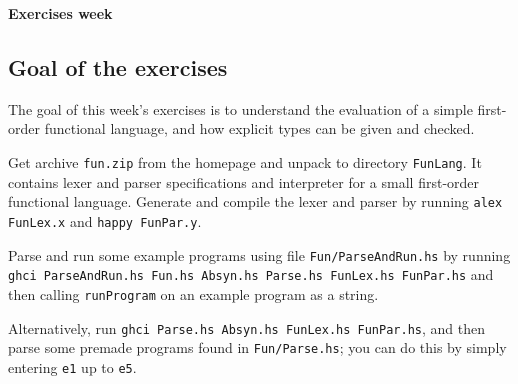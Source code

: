 \documentclass[a4paper]{article}
\begin{document}
\begin{center}
{\Large\bf Exercises week }%
\end{center}

\subsection*{Goal of the exercises}

The goal of this week's exercises is to understand the evaluation of a
simple first-order functional language, and how explicit types can be
given and checked.


\begin{exercise}\label{exer-fun-build}
  Get archive \texttt{fun.zip} from the homepage and unpack to
  directory \texttt{FunLang}\@.  It contains lexer and parser
  specifications and interpreter for a small first-order functional
  language.  Generate and compile the lexer and parser by running
  \texttt{alex FunLex.x} and \texttt{happy FunPar.y}\@.
  
  Parse and run some example programs using
  file \texttt{Fun/ParseAndRun.hs} by running \texttt{ghci ParseAndRun.hs Fun.hs Absyn.hs Parse.hs FunLex.hs FunPar.hs} and then calling \texttt{runProgram} on an example program as a string.
  
  
  Alternatively, run \texttt{ghci Parse.hs Absyn.hs FunLex.hs FunPar.hs}, and then parse some premade programs found in \texttt{Fun/Parse.hs}; you can do this by simply entering \texttt{e1} up to \texttt{e5}.
\end{exercise}
\end{document}

